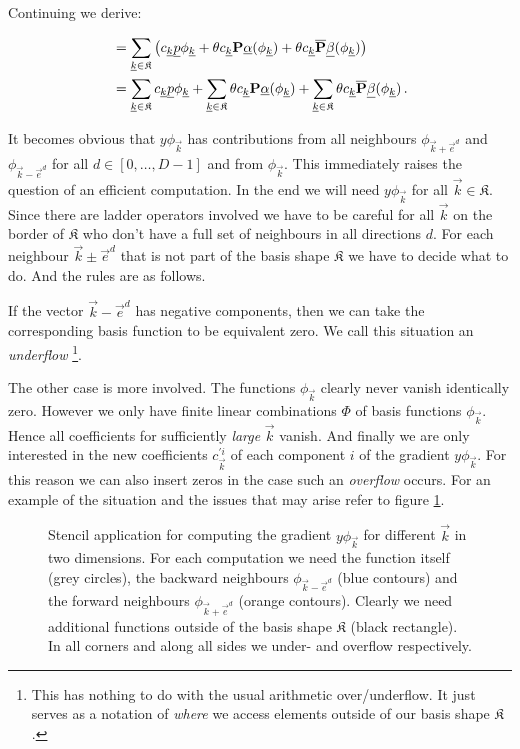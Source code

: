 Continuing we derive:

\begin{align*}
  & = \sum_{\underline{k}\in\mathfrak{K}}
        \left(
          c_{\underline{k}} \underline{p} \phi_{\underline{k}}
          + \theta c_{\underline{k}} \mathbf{P} \underline{\alpha}(\phi_{\underline{k}})
          + \theta c_{\underline{k}} \overline{\mathbf{P}} \underline{\beta}(\phi_{\underline{k}})
        \right) \nonumber\\
  & = \sum_{\underline{k}\in\mathfrak{K}} c_{\underline{k}} \underline{p} \phi_{\underline{k}}
    + \sum_{\underline{k}\in\mathfrak{K}} \theta c_{\underline{k}} \mathbf{P} \underline{\alpha}(\phi_{\underline{k}})
    + \sum_{\underline{k}\in\mathfrak{K}} \theta c_{\underline{k}} \overline{\mathbf{P}} \underline{\beta}(\phi_{\underline{k}}) \,.
\end{align*}

It becomes obvious that $y \phi_{\vec{k}}$ has contributions from all neighbours
$\phi_{\vec{k} + \vec{e}^d}$ and $\phi_{\vec{k} - \vec{e}^d}$ for all $d \in [0, \ldots, D-1]$
and from $\phi_{\vec{k}}$. This immediately raises the question of an efficient
computation. In the end we will need $y \phi_{\vec{k}}$ for all $\vec{k} \in \mathfrak{K}$.
Since there are ladder operators involved we have to be careful for all $\vec{k}$
on the border of $\mathfrak{K}$ who don't have a full set of neighbours in all
directions $d$. For each neighbour $\vec{k}\pm\vec{e}^d$ that is not part of the
basis shape $\mathfrak{K}$ we have to decide what to do. And the rules are as follows.

If the vector $\vec{k}-\vec{e}^d$ has negative components, then we can take the
corresponding basis function to be equivalent zero. We call this situation an
\emph{underflow} \footnote{ This has nothing to do with the usual arithmetic
over/underflow. It just serves as a notation of \emph{where} we access elements
outside of our basis shape $\mathfrak{K}$.}.

The other case is more involved. The functions $\phi_{\vec{k}}$ clearly never
vanish identically zero. However we only have finite linear combinations $\Phi$ of
basis functions $\phi_{\vec{k}}$. Hence all coefficients for sufficiently \emph{large}
$\vec{k}$ vanish. And finally we are only interested in the new coefficients
$c_{\vec{k}}^{\prime i}$ of each component $i$ of the gradient $y \phi_{\vec{k}}$. For
this reason we can also insert zeros in the case such an \emph{overflow} occurs.
For an example of the situation and the issues that may arise refer to figure
\ref{fig:grad_phi_kl_stencil}.

\begin{figure}
  \centering
  
  \caption[Computing the gradient in two dimensions] {Stencil application for
           computing the gradient $y \phi_{\vec{k}}$ for different $\vec{k}$ in
           two dimensions. For each computation we need the function itself
           (grey circles), the backward neighbours $\phi_{\vec{k}-\vec{e}^d}$
           (blue contours) and the forward neighbours $\phi_{\vec{k}+\vec{e}^d}$
           (orange contours). Clearly we need additional functions outside of
           the basis shape $\mathfrak{K}$ (black rectangle). In all corners
            and along all sides we under- and overflow respectively.}
  \label{fig:grad_phi_kl_stencil}
\end{figure}

